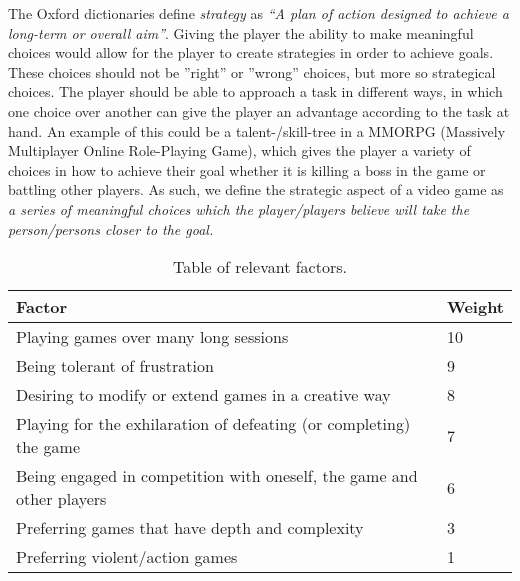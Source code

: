 The Oxford dictionaries define \textit{strategy} as \textit{``A plan of action designed to achieve a long-term or overall aim''}.\cite{strategyOx}
Giving the player the ability to make meaningful choices would allow for the player to create strategies in order to achieve goals.
These choices should not be ''right'' or ''wrong'' choices, but more so strategical choices. The player should be able to approach a task in different ways, in which one choice over another can give the player an advantage according to the task at hand. 
An example of this could be a talent-/skill-tree in a MMORPG (Massively Multiplayer Online Role-Playing Game), which gives the player a variety of choices in how to achieve their goal whether it is killing a boss in the game or battling other players.
As such, we define the strategic aspect of a video game as \emph{a series of meaningful choices which the player/players believe will take the person/persons closer to the goal.}

\begin{table}[h]
\begin{tabular}{|l|l|}
\hline
\rowcolor[HTML]{C0C0C0} 
Factor                                                                & Weight  \\ \hline
Playing games over many long sessions                                 & 10     	\\ \hline
Being tolerant of frustration                                         & 9       \\ \hline
Desiring to modify or extend games in a creative way                  & 8       \\ \hline
Playing for the exhilaration of defeating (or completing) the game    & 7       \\ \hline
Being engaged in competition with oneself, the game and other players & 6       \\ \hline
Preferring games that have depth and complexity                       & 3       \\ \hline
Preferring violent/action games                                       & 1       \\ \hline
\end{tabular}
\caption{Table of relevant factors.}
\label{tab:relevantFactors}
\end{table}
